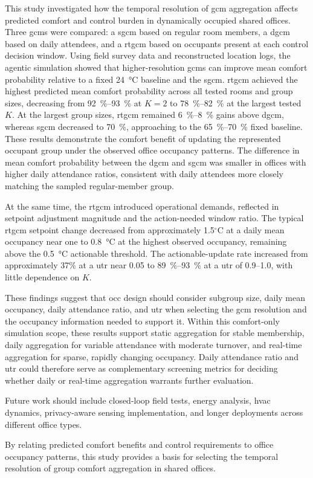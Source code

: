 This study investigated how the temporal resolution of \ac{gcm} aggregation affects predicted comfort and control burden in dynamically occupied shared offices.
Three \acp{gcm} were compared: a \ac{sgcm} based on regular room members, a \ac{dgcm} based on daily attendees, and a \ac{rtgcm} based on occupants present at each control decision window.
Using field survey data and reconstructed location logs, the agentic simulation showed that higher-resolution \acp{gcm} can improve mean comfort probability relative to a fixed \qty{24}{\celsius} baseline and the \ac{sgcm}.
\ac{rtgcm} achieved the highest predicted mean comfort probability across all tested rooms and group sizes, decreasing from \qtyrange{92}{93}{\percent} at $K=2$ to \qtyrange{78}{82}{\percent} at the largest tested $K$.
At the largest group sizes, \ac{rtgcm} remained \qtyrange{6}{8}{\percent} gains above \ac{dgcm}, whereas \ac{sgcm} decreased to \qty{70}{\percent}, approaching to the \qtyrange{65}{70}{\percent} fixed baseline.
These results demonstrate the comfort benefit of updating the represented occupant group under the observed office occupancy patterns.
The difference in mean comfort probability between the \ac{dgcm} and \ac{sgcm} was smaller in offices with higher daily attendance ratios, consistent with daily attendees more closely matching the sampled regular-member group.

At the same time, the \ac{rtgcm} introduced operational demands, reflected in setpoint adjustment magnitude and the action-needed window ratio.
The typical \ac{rtgcm} setpoint change decreased from approximately 1.5$^\circ$C at a daily mean occupancy near one to \qty{0.8}{\celsius} at the highest observed occupancy, remaining above the \qty{0.5}{\celsius} actionable threshold.
The actionable-update rate increased from approximately 37\% at a \ac{utr} near 0.05 to \qtyrange{89}{93}{\percent} at a \ac{utr} of 0.9--1.0, with little dependence on $K$.

These findings suggest that \ac{occ} design should consider subgroup size, daily mean occupancy, daily attendance ratio, and \ac{utr} when selecting the \ac{gcm} resolution and the occupancy information needed to support it.
Within this comfort-only simulation scope, these results support static aggregation for stable membership, daily aggregation for variable attendance with moderate turnover, and real-time aggregation for sparse, rapidly changing occupancy.
Daily attendance ratio and \ac{utr} could therefore serve as complementary screening metrics for deciding whether daily or real-time aggregation warrants further evaluation.

Future work should include closed-loop field tests, energy analysis, \ac{hvac} dynamics, privacy-aware sensing implementation, and longer deployments across different office types.

By relating predicted comfort benefits and control requirements to office occupancy patterns, this study provides a basis for selecting the temporal resolution of group comfort aggregation in shared offices.

